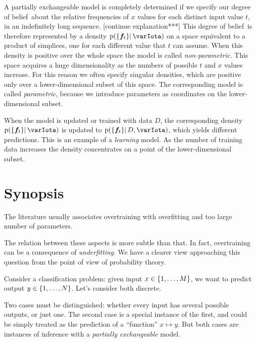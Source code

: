 \documentclass[\ifafour a4paper,12pt,\else a5paper,10pt,\fi%
onecolumn,oneside,article,%
british%
]{memoir}
\theoremstyle{remark}
\theoremstyle{innote}
\DeclarePairedDelimiter\set{\{}{\}}
\newcommand*{\pf}{\mathrm{p}}%
\renewcommand*{\|}{\mathpunct{|}}
\newcommand*{\dob}{degree of belief}
\newcommand*{\yI}{\varIota}
\newcommand*{\yD}{D}
\newcommand*{\yf}{\bm{f}}
\begin{document}
A partially exchangeable model is completely determined if we specify our
\dob\ about the relative frequencies of $x$ values for each distinct input
value $t$, in an indefinitely long sequence. [continue explanation***] This
\dob\ is therefore represented by a density $\pf(\set{\yf_t} \| \yI)$ on a
space equivalent to a product of simplices, one for each different value
that $t$ can assume. When this density is positive over the whole space the
model is called \emph{non-parametric}. This space acquires a huge
dimensionality as the numbers of possible $t$ and $x$ values increase. For
this reason we often specify singular densities, which are positive only
over a lower-dimensional subset of this space. The corresponding model is
called \emph{parametric}, because we introduce parameters as coordinates on
the lower-dimensional subset.



When the model is updated or trained with data $\yD$, the corresponding
density $\pf(\set{\yf_t} \| \yI)$ is updated to
$\pf(\set{\yf_t} \| \yD, \yI)$, which yields different predictions. This is
an example of a \emph{learning} model. As the number of training data
increases the density concentrates on a point of the lower-dimensional subset.

\section{Synopsis}
\label{sec:synopsis}

The literature usually associates overtraining with overfitting and
too large number of parameters.

The relation between these aspects is more subtle than that. In fact,
overtraining can be a consequence of \emph{underfitting}. We have a clearer
view approaching this question from the point of view of probability
theory.

Consider a classification problem: given input
$x \in \set{1,\dotsc, M}$, we want to predict output
$y \in \set{1,\dotsc,N}$. Let's consider both discrete.

Two cases must be distinguished: whether every input has several possible
outputs, or just one. The second case is a special instance of the first,
and could be simply treated as the prediction of a \enquote{function}
$x\mapsto y$. But both cases are instances of inference with a
\emph{partially exchangeable} model.
\end{document}
